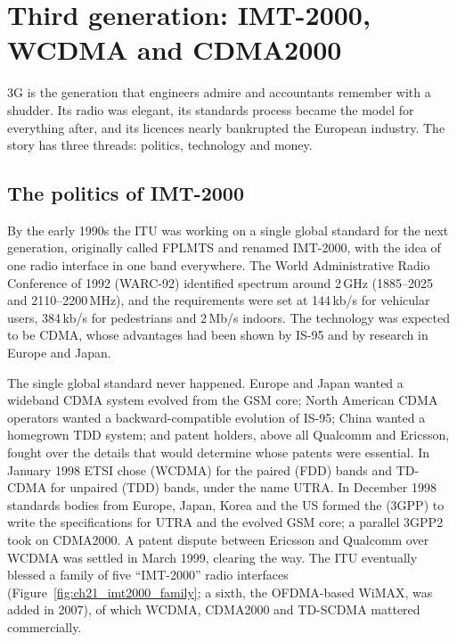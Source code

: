 \section{Third generation: IMT-2000, WCDMA and CDMA2000}
\label{sec:ch21:3g}

3G is the generation that engineers admire and accountants remember with a shudder. Its radio was
elegant, its standards process became the model for everything after, and its licences nearly
bankrupted the European industry. The story has three threads: politics, technology and money.


\subsection{The politics of IMT-2000}

By the early 1990s the ITU was working on a single global standard for the next generation,
originally called FPLMTS and renamed IMT-2000, with the idea of one radio interface in one band
everywhere. The World Administrative Radio Conference of 1992 (WARC-92) identified spectrum around
2\,GHz (1885--2025 and 2110--2200\,MHz), and the requirements were set at 144\,kb/s for vehicular
users, 384\,kb/s for pedestrians and 2\,Mb/s indoors. The technology was expected to be CDMA, whose
advantages had been shown by IS-95 and by research in Europe and Japan.

The single global standard never happened. Europe and Japan wanted a wideband CDMA system evolved
from the GSM core; North American CDMA operators wanted a backward-compatible evolution of IS-95;
China wanted a homegrown TDD system; and patent holders, above all Qualcomm and Ericsson, fought over
the details that would determine whose patents were essential. In January 1998 ETSI chose
 (WCDMA) for the paired (FDD) bands and TD-CDMA for unpaired (TDD) bands, under
the name UTRA. In December 1998 standards bodies from Europe, Japan, Korea and the US formed the
 (3GPP) to write the specifications for UTRA and the
evolved GSM core; a parallel 3GPP2 took on CDMA2000. A patent dispute between Ericsson and Qualcomm
over WCDMA was settled in March 1999, clearing the way. The ITU eventually blessed a family of five
``IMT-2000'' radio interfaces (Figure~\ref{fig:ch21_imt2000_family}; a sixth, the OFDMA-based WiMAX,
was added in 2007), of which WCDMA, CDMA2000 and TD-SCDMA mattered commercially.

